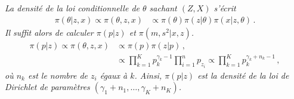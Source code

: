 \documentclass[a4paper,10pt,fleqn]{article}
\newcommand{\1}{\ensuremath{\mathbbm{1}}}
\begin{document}
\begin{enumerate}
{\em
La densit\'e de la loi conditionnelle de $\theta$ sachant $(Z,X)$ s'\'ecrit
\begin{align*}
\pi(\theta|z,x)\propto \pi(\theta,z,x) &\propto \pi(\theta)\pi(z|\theta) \pi(x|z,\theta)\,. %
\end{align*}
Il suffit alors de calculer $\pi(p|z)$ et $\pi(m,s^2|x,z)$. 
\begin{align*}
\pi(p|z)\propto \pi(\theta,z,x) &\propto \pi(p)\pi(z|p) \,,\\
&\propto \prod_{k=1}^Kp_k^{\gamma_k-1} \prod_{i=1}^n p_{z_i} \propto \prod_{k=1}^Kp_k^{\gamma_k+n_k-1}\,,
\end{align*}
o\`u $n_k$ est le nombre de $z_i$ \'egaux \`a $k$. Ainsi, $\pi(p|z)$ est la densit\'e de la loi de Dirichlet de param\`etres $(\gamma_1+n_1,\ldots,\gamma_K+n_K)$. 

\medskip

}
\end{enumerate}
\end{document}
